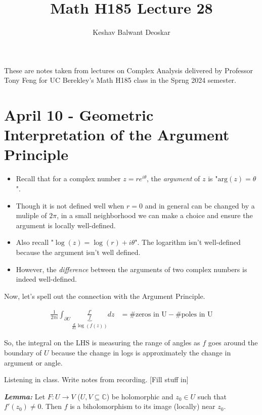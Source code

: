 \documentclass{article}
\title{Math H185 Lecture 28}
\author{Keshav Balwant Deoskar}
\newcommand{\C}{\mathbb{C}}
\begin{document}
\maketitle

These are notes taken from lectures on Complex Analysis delivered by Professor Tony Feng for UC Berekley's Math H185 class in the Sprng 2024 semester.

\tableofcontents

\pagebreak

\section{April 10 - Geometric Interpretation of the Argument Principle}

\begin{itemize}
  \item Recall that for a complex number $z = re^{i\theta}$, the \emph{argument} of $z$ is "$\mathrm{arg}(z) = \theta$".
  \item Though it is not defined well when $r = 0$ and in general can be changed by a muliple of $2\pi$, in a small neighborhood we can make a choice and ensure the argument is locally well-defined.
  \item Also recall "$\log(z) = \log(r) + i\theta$". The logarithm isn't well-defined because the argument isn't well defined.
  \item However, the \emph{difference} between the arguments of two complex numbers is indeed well-defined.
\end{itemize}

\vskip 0.5cm
Now, let's spell out the connection with the Argument Principle.

\vskip 0.5cm
\begin{align*}
  \frac{1}{2\pi i} \int_{\partial U} \underbrace{\frac{f'}{f}}_{\frac{d}{dz} \log \left(f(z)\right)} dz &= \text{\# zeros in U} - \text{\# poles in U}
\end{align*}

So, the integral on the LHS is measuring the range of angles as $f$ goes around the boundary of $U$ because the change in logs is approximately the change in argument or angle.

\vskip 0.5cm
Listening in class. Write notes from recording.
[Fill stuff in]

\vskip 1cm
\begin{dottedbox}
  \emph{\textbf{Lemma:}} Let $F : U \rightarrow V$ ($U, V \subseteq \C$) be holomorphic and $z_0 \in U$ such that $f'(z_0) \neq 0$. Then $f$ is a biholomorphism to its image (locally) near $z_0$. 
\end{dottedbox}
\end{document}
